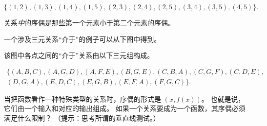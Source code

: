 \[ \{(1,2), (1,3), (1,4), (1,5), (2,3), (2,4), (2,5), (3,4), (3,5), (4,5) \}.
\]

关系\emph{中}的序偶是那些第一个元素小于第二个元素的序偶。

一个涉及三元关系“介于”的例子可以从下图中得到。

\medskip


\medskip


该图中各点之间的“介于”关系由以下三元组构成。

\begin{gather*} \{ (A,B,C), (A,G,D), (A,F,E), (B,G,E), (C,B,A), (C,G,F), (C,D,E), \\
  (D,G,A), (E,D,C), (E,G,B), (E,F,A), (F,G,C) \}.
\end{gather*}


\begin{exer}
  当把函数看作一种特殊类型的关系时，序偶的形式是 $(x, f(x))$。
  也就是说，它们由一个输入和对应的输出组成。
  如果一个关系要成为一个函数，其序偶必须满足什么限制？
  （提示：思考所谓的垂直线测试。）
\end{exer}

\newpage





%
%

